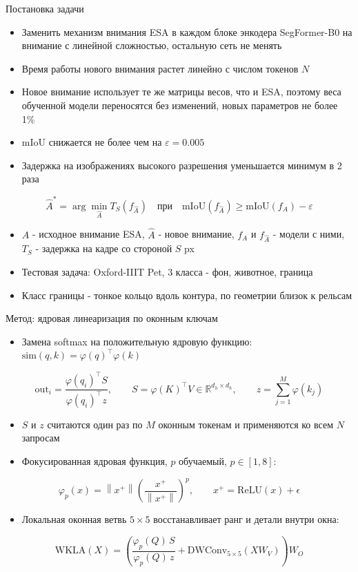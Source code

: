 \documentclass[aspectratio=169,xcolor=table]{beamer}
\begin{document}
\begin{frame}{Постановка задачи}
  \small
  \begin{itemize}
    \item Заменить механизм внимания ESA в каждом блоке энкодера SegFormer-B0 на внимание с линейной сложностью, остальную сеть не менять
    \item Время работы нового внимания растет линейно с числом токенов $N$
    \item Новое внимание использует те же матрицы весов, что и ESA, поэтому веса обученной модели переносятся без изменений, новых параметров не более 1\%
    \item mIoU снижается не более чем на $\varepsilon = 0.005$
    \item Задержка на изображениях высокого разрешения уменьшается минимум в 2 раза
  \end{itemize}
  $$
  \hat{A}^{*} = \arg\min_{\hat{A}} T_{S}\left(f_{\hat{A}}\right) \quad \text{при} \quad \mathrm{mIoU}\left(f_{\hat{A}}\right) \geq \mathrm{mIoU}\left(f_{A}\right) - \varepsilon
  $$
  \begin{itemize}
    \item $A$ - исходное внимание ESA, $\hat{A}$ - новое внимание, $f_A$ и $f_{\hat{A}}$ - модели с ними, $T_S$ - задержка на кадре со стороной $S$ px
    \item Тестовая задача: Oxford-IIIT Pet, 3 класса - фон, животное, граница
    \item Класс границы - тонкое кольцо вдоль контура, по геометрии близок к рельсам
  \end{itemize}
\end{frame}

\begin{frame}{Метод: ядровая линеаризация по оконным ключам}
  \small
  \begin{itemize}
    \item Замена softmax на положительную ядровую функцию: $\mathrm{sim}(q, k) = \varphi(q)^{\top} \varphi(k)$
  \end{itemize}
  $$
  \mathrm{out}_i = \frac{\varphi(q_i)^{\top} S}{\varphi(q_i)^{\top} z}, \qquad S = \varphi(K)^{\top} V \in \mathbb{R}^{d_h \times d_h}, \qquad z = \sum_{j=1}^{M} \varphi(k_j)
  $$
  \begin{itemize}
    \item $S$ и $z$ считаются один раз по $M$ оконным токенам и применяются ко всем $N$ запросам
    \item Фокусированная ядровая функция, $p$ обучаемый, $p \in [1, 8]$:
  \end{itemize}
  $$
  \varphi_p(x) = \left\| x^{+} \right\| \left(\frac{x^{+}}{\left\| x^{+} \right\|}\right)^{p}, \qquad x^{+} = \mathrm{ReLU}(x) + \epsilon
  $$
  \begin{itemize}
    \item Локальная оконная ветвь $5 \times 5$ восстанавливает ранг и детали внутри окна:
  \end{itemize}
  $$
  \mathrm{WKLA}(X) = \left(\frac{\varphi_p(Q)\, S}{\varphi_p(Q)\, z} + \mathrm{DWConv}_{5 \times 5}\left(X W_V\right)\right) W_O
  $$
\end{frame}
\end{document}
